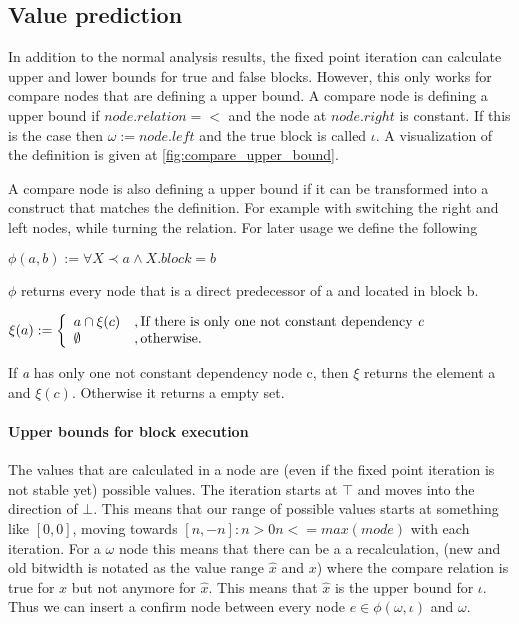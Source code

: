\subsection{Value prediction}
In addition to the normal analysis results, the fixed point iteration can calculate upper and lower bounds for true and false blocks. However, this only works for compare nodes that are defining a upper bound. \newline
A compare node is defining a upper bound if $node.relation = <$ and the node at $node.right$ is constant. If this is the case then $\omega := node.left$ and the true block is called $\iota$. A visualization of the definition is given at \ref{fig:compare_upper_bound}.

\newline
A compare node is also defining a upper bound if it can be transformed into a construct that matches the definition. For example with switching the right and left nodes, while turning the relation. \newline
For later usage we define the following 
\begin{center}
$\phi(a, b) := \forall X \prec a \wedge X.block = b$ 
\end{center}
$\phi$ returns every node that is a direct predecessor of a and located in block b.
\begin{center}
$\xi(a) := 
\left\{
	\begin{array}{l}
		a \cap \xi(c)\\ 
		\emptyset
	\end{array}
	\begin{array}{l}
		, \text{If there is only one not constant dependency \textit{c}} \\ 
		, \text{otherwise}.
	\end{array}
\right.$
\end{center}

If \textit{a} has only one not constant dependency node c, then $\xi$ returns the element a and $\xi(c)$. Otherwise it returns a empty set.

\paragraph{Upper bounds for block execution}
The values that are calculated in a node are (even if the fixed point iteration is not stable yet) possible values. The iteration starts at $\top$ and moves into the direction of $\bot$. This means that our range of possible values starts at something like $[0,0]$, moving towards $[n,-n]: n > 0 n <= max(mode)$ with each iteration. For a $\omega$ node this means that there can be a a recalculation, (new and old bitwidth is notated as the value range $\hat{x}$ and $x$) where the compare relation is true for $x$ but not anymore for  $\hat{x}$. This means that $\hat{x}$ is the upper bound for $\iota$. Thus we can insert a confirm node between every node $e \in \phi(\omega, \iota)$ and $\omega$.

